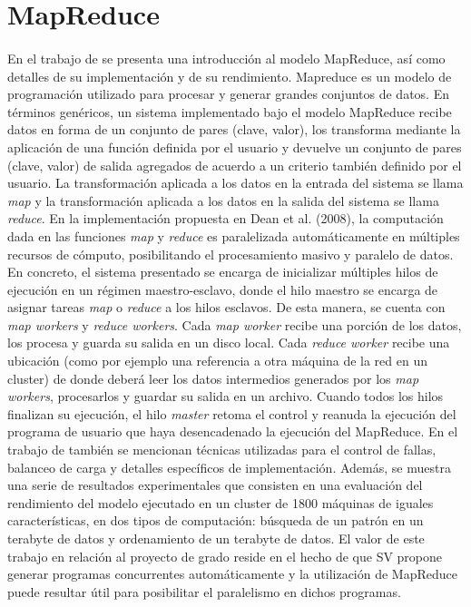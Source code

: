 \section{MapReduce} \label{section-trabajos-relacionados-mapreduce}

\paragraph{}En el trabajo de \citet{mapreduce} se presenta una introducción al modelo MapReduce, así como detalles de su implementación y de su rendimiento.
Mapreduce es un modelo de programación utilizado para procesar y generar grandes conjuntos de datos.
En términos genéricos, un sistema implementado bajo el modelo MapReduce recibe datos en forma de un conjunto de pares (clave, valor), los transforma mediante la aplicación de una función definida por el usuario y devuelve un conjunto de pares (clave, valor) de salida agregados de acuerdo a un criterio también definido por el usuario.
La transformación aplicada a los datos en la entrada del sistema se llama \textit{map} y la transformación aplicada a los datos en la salida del sistema se llama \textit{reduce}.
En la implementación propuesta en Dean et al.
(2008), la computación dada en las funciones \textit{map} y \textit{reduce} es paralelizada automáticamente en múltiples recursos de cómputo, posibilitando el procesamiento masivo y paralelo de datos.
En concreto, el sistema presentado se encarga de inicializar múltiples hilos de ejecución en un régimen maestro-esclavo, donde el hilo maestro se encarga de asignar tareas \textit{map} o \textit{reduce} a los hilos esclavos.
De esta manera, se cuenta con \textit{map workers} y \textit{reduce workers}.
Cada \textit{map worker} recibe una porción de los datos, los procesa y guarda su salida en un disco local.
Cada \textit{reduce worker} recibe una ubicación (como por ejemplo una referencia a otra máquina de la red en un cluster) de donde deberá leer los datos intermedios generados por los \textit{map workers}, procesarlos y guardar su salida en un archivo.
Cuando todos los hilos finalizan su ejecución, el hilo \textit{master} retoma el control y reanuda la ejecución del programa de usuario que haya desencadenado la ejecución del MapReduce.
En el trabajo de \citet{mapreduce} también se mencionan técnicas utilizadas para el control de fallas, balanceo de carga y detalles específicos de implementación.
Además, se muestra una serie de resultados experimentales que consisten en una evaluación del rendimiento del modelo ejecutado en un cluster de 1800 máquinas de iguales características, en dos tipos de computación: búsqueda de un patrón en un terabyte de datos y ordenamiento de un terabyte de datos. 
El valor de este trabajo en relación al proyecto de grado reside en el hecho de que SV propone generar programas concurrentes automáticamente y la utilización de MapReduce puede resultar útil para posibilitar el paralelismo en dichos programas.

